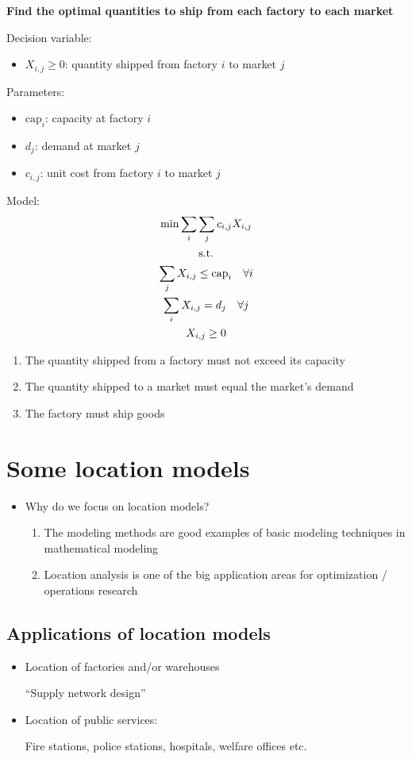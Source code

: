 \documentclass[10pt]{article}
\begin{document}
\textbf{Find the optimal quantities to ship from each factory to each market}

Decision variable: 
\begin{itemize}
    \item $X_{i, j} \ge 0 $: quantity shipped from factory $i $ to market $j $
\end{itemize}

Parameters: 
\begin{itemize}
    \item $\text{cap}_i $: capacity at factory $i $
    \item $d_j $: demand at market $j $
    \item $c_{i, j} $: unit cost from factory $i $ to market $j $
\end{itemize}
Model: 
\begin{gather}
    \min\sum_i\sum_j c_{i, j}X_{i, j}\notag\\
    \text{s.t.}\notag\\
    \sum_jX_{i, j} \le \text{cap}_i\quad\forall i\\
    \sum_i X_{i, j} = d_j\quad\forall j\\
    X_{i, j} \ge 0
\end{gather}
\begin{enumerate}
    \item The quantity shipped from a factory must not exceed its capacity
    \item The quantity shipped to a market must equal the market's demand 
    \item The factory must ship goods
\end{enumerate}
\newpage
\section{Some location models}
\begin{itemize}
    \item Why do we focus on location models?
    \begin{enumerate}
        \item The modeling methods are good examples of basic modeling techniques in mathematical modeling 
        \item Location analysis is one of the big application areas for optimization / operations research
    \end{enumerate}
\end{itemize}
\subsection{Applications of location models}
\begin{itemize}
    \item Location of factories and/or warehouses

    ``Supply network design''
    \item Location of public services: 

    Fire stations, police stations, hospitals, welfare offices etc. 
\end{itemize}
\end{document}
